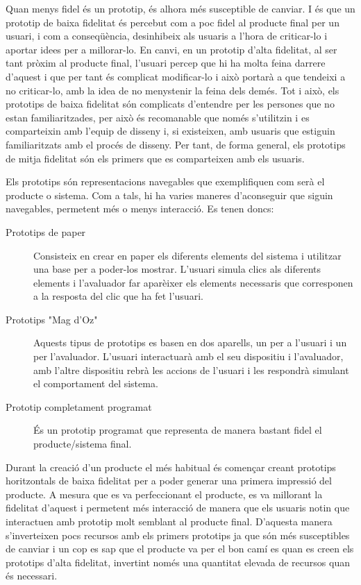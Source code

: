 Quan menys fidel és un prototip, és alhora més susceptible de canviar. I és que un prototip de baixa fidelitat és percebut com a poc fidel al producte final per un usuari, i com a conseqüència, desinhibeix als usuaris a l'hora de criticar-lo i aportar idees per a millorar-lo. En canvi, en un prototip d'alta fidelitat, al ser tant pròxim al producte final, l'usuari percep que hi ha molta feina darrere d'aquest i que per tant és complicat modificar-lo i això portarà a que tendeixi a no criticar-lo, amb la idea de no menystenir la feina dels demés. Tot i això, els prototips de baixa fidelitat són complicats d'entendre per les persones que no estan familiaritzades, per això és recomanable que només s'utilitzin i es comparteixin amb l'equip de disseny i, si existeixen, amb usuaris que estiguin familiaritzats amb el procés de disseny. Per tant, de forma general, els prototips de mitja fidelitat són els primers que es comparteixen amb els usuaris. 


Els prototips són representacions navegables que exemplifiquen com serà el producte o sistema. Com a tals, hi ha varies maneres d'aconseguir que siguin navegables, permetent més o menys interacció. Es tenen doncs:

\begin{description}
\item[Prototips de paper] Consisteix en crear en paper els diferents elements del sistema i utilitzar una base per a poder-los mostrar. L'usuari simula clics als diferents elements i l'avaluador far aparèixer els elements necessaris que corresponen a la resposta del clic que ha fet l'usuari. 
\item[Prototips "Mag d'Oz"] Aquests tipus de prototips es basen en dos aparells, un per a l'usuari i un per l'avaluador. L'usuari interactuarà amb el seu dispositiu i l'avaluador, amb l'altre dispositiu rebrà les accions de l'usuari i les respondrà simulant el comportament del sistema.
\item[Prototip completament programat] És un prototip programat que representa de manera bastant fidel el producte/sistema final.
\end{description}

Durant la creació d'un producte el més habitual és començar creant prototips horitzontals de baixa fidelitat per a poder generar una primera impressió del producte. A mesura que es va perfeccionant el producte, es va millorant la fidelitat d'aquest i permetent més interacció de manera que els usuaris notin que interactuen amb prototip molt semblant al producte final. D'aquesta manera s'inverteixen pocs recursos amb els primers prototips ja que són més susceptibles de canviar i un cop es sap que el producte va per el bon camí es quan es creen els prototips d'alta fidelitat, invertint només una quantitat elevada de recursos quan és necessari. 

